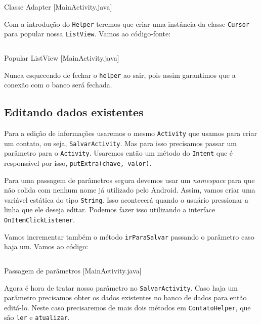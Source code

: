 \begin{listing}[H]
  \inputminted[linenos=true,frame=bottomline,tabsize=3]{ java }{ source/MainActivity-5.java }
  \caption{Classe Adapter [MainActivity.java]}
\end{listing}

Com a introdução do \texttt{Helper} teremos que criar uma instância da
classe \texttt{Cursor} para popular nossa \texttt{ListView}. Vamos ao
código-fonte:

\begin{listing}[H]
  \inputminted[linenos=true,frame=bottomline,tabsize=3]{ java }{ source/MainActivity-6.java }
  \caption{Popular ListView [MainActivity.java]}
\end{listing}

Nunca esquecendo de fechar o \texttt{helper} ao sair, pois assim
garantimos que a conexão com o banco será fechada.

\subsection{Editando dados existentes \label{ssec:edit}}

Para a edição de informações usaremos o mesmo \texttt{Activity} que
usamos para criar um contato, ou seja, \texttt{SalvarActivity}. Mas para
isso precisamos passar um parâmetro para o \texttt{Activity}. Usaremos
então um método do \texttt{Intent} que é responsável por isso,
\texttt{putExtra(chave, valor)}.

Para uma passagem de parâmetros segura devemos usar um \emph{namespace}
para que não colida com nenhum nome já utilizado pelo Android. Assim,
vamos criar uma variável estática do tipo \texttt{String}. Isso
acontecerá quando o usuário pressionar a linha que ele deseja editar.
Podemos fazer isso utilizando a interface \texttt{OnItemClickListener}.

Vamos incrementar também o método \texttt{irParaSalvar} passando o
parâmetro caso haja um. Vamos ao código:

\begin{listing}[H]
  \inputminted[linenos=true,frame=bottomline,tabsize=3]{ java }{ source/MainActivity-7.java }
  \caption{Passagem de parâmetros [MainActivity.java]}
\end{listing}

Agora é hora de tratar nosso parâmetro no \texttt{SalvarActivity}. Caso
haja um parâmetro precisamos obter os dados existentes no banco de dados
para então editá-lo. Neste caso precisaremos de mais dois métodos em
\texttt{ContatoHelper}, que são \texttt{ler} e \texttt{atualizar}.

